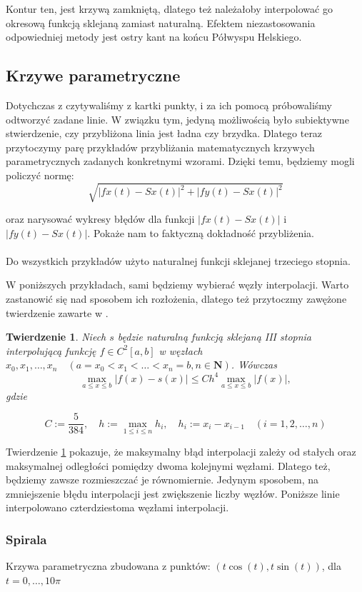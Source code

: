 \documentclass{article}
\newtheorem{twr}{Twierdzenie}
\begin{document}
	Kontur ten, jest krzywą zamkniętą, dlatego też należałoby interpolować go okresową funkcją sklejaną zamiast naturalną. Efektem niezastosowania odpowiedniej metody jest ostry kant na końcu Półwyspu Helskiego.
	
	\subsection{Krzywe parametryczne}
	
	Dotychczas z czytywaliśmy z kartki punkty, i za ich pomocą próbowaliśmy odtworzyć zadane linie. W związku tym, jedyną możliwością było subiektywne stwierdzenie, czy przybliżona linia jest ładna czy brzydka. Dlatego teraz przytoczymy parę przykładów przybliżania matematycznych krzywych parametrycznych zadanych konkretnymi wzorami. Dzięki temu, będziemy mogli policzyć normę:
	$$\sqrt{|fx(t) - Sx(t)|^2 + |fy(t) - Sx(t)|^2} $$
	
	oraz narysować wykresy błędów dla funkcji $|fx(t) - Sx(t)|$ i $|fy(t) - Sx(t)|$. Pokaże nam to faktyczną dokładność przybliżenia.
	\\\\
	Do wszystkich przykładów użyto naturalnej funkcji sklejanej trzeciego stopnia.
	
	W poniższych przykładach, sami będziemy wybierać węzły interpolacji. Warto zastanowić się nad sposobem ich rozłożenia, dlatego też przytoczmy zawężone twierdzenie zawarte w \cite{SLE}.
	
	\begin{twr} \label{tw: blad sklejanej}
		Niech $s$ będzie naturalną funkcją sklejaną III stopnia interpolującą funkcję $f \in C^2[a,b] $ w węzłach $x_0,x_1,\dots,x_n \quad (a = x_0 < x_1 < \dots < x_n = b, n \in \textbf{N} )$. Wówczas
		$$ \max_{a \leq x \leq b} |f(x) - s(x)|\leq C h^{4} \max_{a \leq x \leq b}|f(x)|, $$
		gdzie
		
		$$ C := \frac{5}{384}, \quad h := \max_{1 \leq i \leq n} h_i, \quad h_i:=x_i-x_{i-1} \quad (i = 1,2,\dots, n) $$
	\end{twr}
	
	Twierdzenie \ref{tw: blad sklejanej} pokazuje, że maksymalny błąd interpolacji zależy od stałych oraz maksymalnej odległości pomiędzy dwoma kolejnymi węzłami. Dlatego też, będziemy zawsze rozmieszczać je równomiernie. Jedynym sposobem, na zmniejszenie błędu interpolacji jest zwiększenie liczby węzłów.
	Poniższe linie interpolowano czterdziestoma węzłami interpolacji.
	
	
	\subsubsection{Spirala} 
	Krzywa parametryczna zbudowana z punktów: $(t\cos(t), t\sin(t) )$, dla $t= 0,\dots,10\pi$
	
\end{document}
